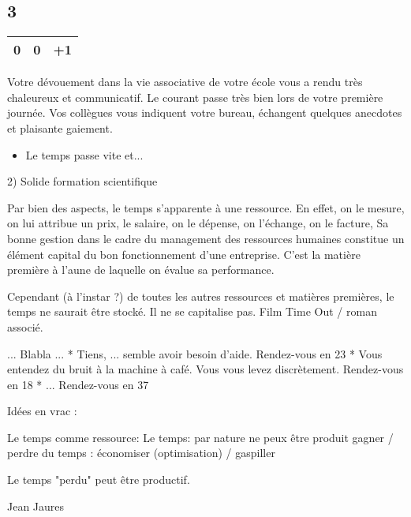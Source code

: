 \documentclass[12pt,a4paper,titlepage]{article}
\newcommand{\update}[3]{
\begin{center}
\begin{tabular}{|c|c|c|}
\hline #1 & #2 & #3 \\ \hline
\end{tabular}
\end{center}
}
\begin{document}
\begin{multicols}{2}
\label{n3}
\subsection*{3}
\update{0}{0}{+1}
Votre dévouement dans la vie associative de votre école vous a rendu très chaleureux et communicatif. Le courant passe très bien lors de votre première journée. Vos collègues vous indiquent votre bureau, échangent quelques anecdotes et plaisante gaiement.

\begin{itemize}
\item Le temps passe vite et...
\end{itemize}




2) Solide formation scientifique


Par bien des aspects, le temps s'apparente à une ressource.
En effet, on le mesure, on lui attribue un prix, le salaire, on le dépense, on l'échange, on le facture,
Sa bonne gestion dans le cadre du management des ressources humaines constitue un élément capital du bon fonctionnement d'une entreprise. C'est la matière première à l'aune de laquelle on évalue sa performance.

Cependant (à l'instar ?) de toutes les autres ressources et matières premières, le temps ne saurait être stocké.
Il ne se capitalise pas.
Film Time Out / roman associé.










... Blabla ...
* Tiens, ... semble avoir besoin d'aide. Rendez-vous en 23
* Vous entendez du bruit à la machine à café. Vous vous levez discrètement. Rendez-vous en 18
* ... Rendez-vous en 37


Idées en vrac :

Le temps comme ressource:
Le temps: par nature ne peux être produit
gagner / perdre du temps : économiser (optimisation) / gaspiller

Le temps "perdu" peut être productif.

Jean Jaures





























\end{multicols}
\end{document}
